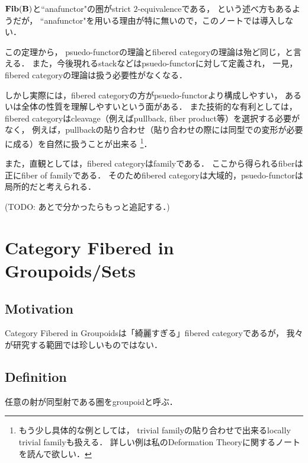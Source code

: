 \documentclass[a4paper, dvipdfmx]{jsarticle}
\begin{document}
    \begin{Remark}
        $\mathbf{Fib}(\mathbf{B})$と``anafunctor"の圏がstrict $2$-equivalenceである，
        という述べ方もあるようだが，
        ``anafunctor"を用いる理由が特に無いので，このノートでは導入しない．
    \end{Remark}

    \begin{Remark}
        この定理から，
        psuedo-functorの理論とfibered categoryの理論は殆ど同じ，と言える．
        また，今後現れるstackなどはpsuedo-functorに対して定義され，
        一見，fibered categoryの理論は扱う必要性がなくなる．
        
        しかし実際には，fibered categoryの方がpsuedo-functorより構成しやすい，
        あるいは全体の性質を理解しやすいという面がある．
        また技術的な有利としては，
        fibered categoryはcleavage（例えばpullback, fiber product等）を選択する必要がなく，
        例えば，pullbackの貼り合わせ（貼り合わせの際には同型での変形が必要に成る）を自然に扱うことが出来る
        \footnote
        {
            もう少し具体的な例としては，
            trivial familyの貼り合わせで出来るlocally trivial familyも扱える．
            詳しい例は私のDeformation Theoryに関するノートを読んで欲しい．
        }．
        
        また，直観としては，fibered categoryはfamilyである．
        ここから得られるfiberは正にfiber of familyである．
        そのためfibered categoryは大域的，psuedo-functorは局所的だと考えられる．

        (TODO: あとで分かったらもっと追記する．)
    \end{Remark}

\section{Category Fibered in Groupoids/Sets}
\subsection{Motivation}
    Category Fibered in Groupoidsは「綺麗すぎる」fibered categoryであるが，
    我々が研究する範囲では珍しいものではない．
    

\subsection{Definition}
    \begin{Def}[Groupoid]
        任意の射が同型射である圏をgroupoidと呼ぶ．
    \end{Def}
\end{document}
